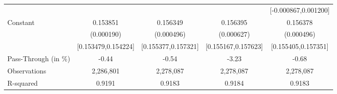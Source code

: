 {\begin{tabular}{l*{4}{c}}
                    &                     &                     &                     &[-0.000867,0.001200]         \\
Constant            &    0.153851\sym{***}&    0.156349\sym{***}&    0.156395\sym{***}&    0.156378\sym{***}\\
                    &  (0.000190)         &  (0.000496)         &  (0.000627)         &  (0.000496)         \\
                    &[0.153479,0.154224]         &[0.155377,0.157321]         &[0.155167,0.157623]         &[0.155405,0.157351]         \\
\midrule
Pass-Through (in \%)&       -0.44         &       -0.54         &       -3.23         &       -0.68         \\
Observations        &   2,286,801         &   2,278,087         &   2,278,087         &   2,278,087         \\
R-squared           &      0.9191         &      0.9183         &      0.9184         &      0.9183         \\
\bottomrule
\end{tabular}
}
